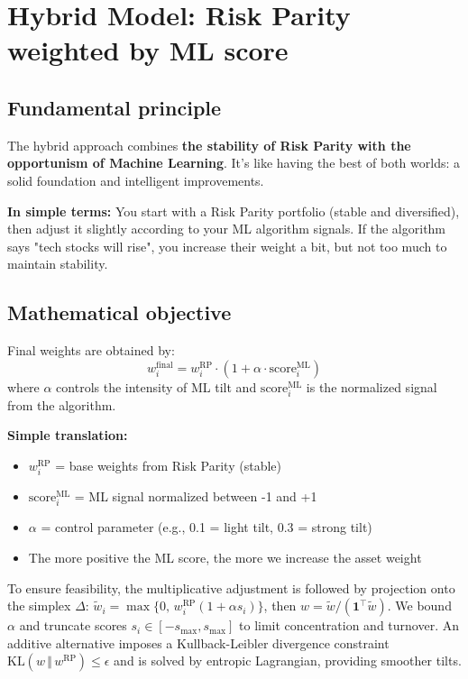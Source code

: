 \documentclass[11pt,a4paper]{article}
\begin{document}
\FloatBarrier
\section{Hybrid Model: Risk Parity weighted by ML score}

\subsection{Fundamental principle}
The hybrid approach combines \textbf{the stability of Risk Parity with the opportunism of Machine Learning}. It's like having the best of both worlds: a solid foundation and intelligent improvements.

\textbf{In simple terms:} You start with a Risk Parity portfolio (stable and diversified), then adjust it slightly according to your ML algorithm signals. If the algorithm says "tech stocks will rise", you increase their weight a bit, but not too much to maintain stability.

\subsection{Mathematical objective}
Final weights are obtained by:
\[w_i^{\text{final}} = w_i^{\text{RP}} \cdot (1 + \alpha \cdot \text{score}_i^{\text{ML}})\]
where \(\alpha\) controls the intensity of ML tilt and \(\text{score}_i^{\text{ML}}\) is the normalized signal from the algorithm.

\textbf{Simple translation:} 
\begin{itemize}
\item \(w_i^{\text{RP}}\) = base weights from Risk Parity (stable)
\item \(\text{score}_i^{\text{ML}}\) = ML signal normalized between -1 and +1
\item \(\alpha\) = control parameter (e.g., 0.1 = light tilt, 0.3 = strong tilt)
\item The more positive the ML score, the more we increase the asset weight
\end{itemize}
\noindent To ensure feasibility, the multiplicative adjustment is followed by projection onto the simplex \(\Delta\): \(\tilde w_i = \max\{0,\, w_i^{\text{RP}} (1+\alpha s_i)\}\), then \(w=\tilde w / (\mathbf{1}^\top \tilde w)\). We bound \(\alpha\) and truncate scores \(s_i\in[-s_{\max}, s_{\max}]\) to limit concentration and turnover. An additive alternative imposes a Kullback-Leibler divergence constraint \(\text{KL}(w\,\Vert\,w^{\text{RP}})\le \epsilon\) and is solved by entropic Lagrangian, providing smoother tilts.
\end{document}
